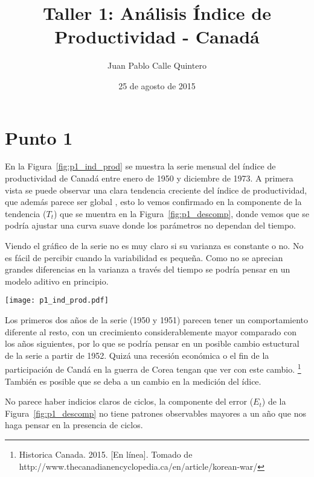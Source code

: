 \documentclass{tufte-handout}
\title{Taller 1: Análisis Índice de Productividad - Canadá}
\author{Juan Pablo Calle Quintero}
\date{25 de agosto de 2015}
\begin{document}
\maketitle

\section*{Punto 1}

En la Figura~\ref{fig:p1_ind_prod} se muestra la serie mensual del índice de productividad de Canadá entre enero de 1950 y diciembre de 1973. A primera vista se puede observar una clara tendencia creciente del índice de productividad, que además parece ser global , esto lo vemos confirmado en la componente de la tendencia ($T_t$) que se muentra en la Figura~\ref{fig:p1_descomp}, donde vemos que se podría ajustar una curva suave donde los parámetros no dependan del tiempo.

Viendo el gráfico de la serie no es muy claro si su varianza es constante o no. No es fácil de percibir cuando la variabilidad es pequeña. Como no se aprecian grandes diferencias en la varianza a través del tiempo se podría pensar en un modelo aditivo en principio.

\begin{figure*}[!h]
    \texttt{[image: p1\_ind\_prod.pdf]}
    \caption{Serie de tiempo del índice de productividad de Canadá desde enero de 1950 hasta diciembre de 1973. Son 288 observaciones en 24 años.}
    \label{fig:p1_ind_prod}
\end{figure*}

Los primeros dos años de la serie (1950 y 1951) parecen tener un comportamiento diferente al resto, con un crecimiento considerablemente mayor comparado con los años siguientes, por lo que se podría pensar en un posible cambio estuctural de la serie a partir de 1952. Quizá una recesión económica o el fin de la participación de Candá en la guerra de Corea tengan que ver con este cambio. \footnote{Historica Canada. 2015. [En línea]. Tomado de http://www.thecanadianencyclopedia.ca/en/article/korean-war/} También es posible que se deba a un cambio en la medición del ídice.

No parece haber indicios claros de ciclos, la componente del error ($E_t$) de la Figura~\ref{fig:p1_descomp} no tiene patrones observables mayores a un año que nos haga pensar en la presencia de ciclos.
\end{document}
